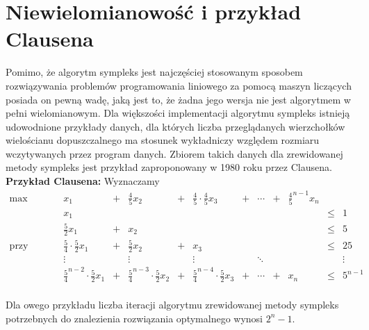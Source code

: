 \documentclass[licencjacka]{pracamgr}
\begin{document}
 \section{Niewielomianowość i przykład Clausena}
Pomimo, że algorytm sympleks jest najczęściej stosowanym sposobem rozwiązywania problemów programowania liniowego za pomocą maszyn liczących posiada on pewną wadę,
jaką jest to, że żadna jego wersja nie jest algorytmem w pełni wielomianowym. Dla większości implementacji algorytmu sympleks istnieją udowodnione przykłady danych,
dla których liczba przeglądanych wierzchołków wielościanu dopuszczalnego ma stosunek wykładniczy względem rozmiaru wczytywanych przez program danych.\newline\newline
Zbiorem takich danych dla zrewidowanej metody sympleks jest przykład zaproponowany w 1980 roku przez Clausena.\newline
\textbf{Przykład Clausena:}\newline
Wyznaczamy\newline
$
\begin{array}{cccccccccccc}\max&x_1&+&\frac{4}{5}x_2&+&\frac{4}{5}\cdot\frac{4}{5}x_3&+&\cdots&+&{\frac{4}{5}}^{n-1}x_n&\\
 &x_1&&&&&&&&&\le&1\\
 &\frac{5}{2}x_1&+&x_2&&&&&&&\le&5\\
\text{przy warunkach}&\frac{5}{4}\cdot\frac{5}{2}x_1&+&\frac{5}{2}x_2&+&x_3&&&&&\le&25\\
 &\vdots&&\vdots&&\vdots&&\ddots&&&&\vdots\\
 &{\frac{5}{4}}^{n-2}\cdot\frac{5}{2}x_1&+&{\frac{5}{4}}^{n-3}\cdot\frac{5}{2}x_2&+&{\frac{5}{4}}^{n-4}\cdot\frac{5}{2}x_3&+&\cdots&+&x_n&\le&5^{n-1}\\
\end{array}
$\newline

Dla owego przykładu liczba iteracji algorytmu zrewidowanej metody sympleks potrzebnych do znalezienia rozwiązania optymalnego wynosi $2^n-1$.\newline
\end{document}
